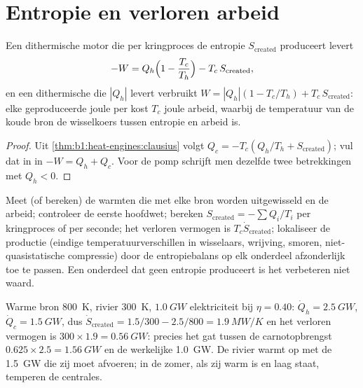 \section{Entropie en verloren arbeid}

\begin{theorem}\label{thm:b1:heat-engines:lostwork}
Een dithermische motor die per kringproces de entropie $S_{\mathrm{created}}$ produceert
levert
\[
-W = Q_h\Bigl(1 - \frac{T_c}{T_h}\Bigr) - T_c\,S_{\mathrm{created}} ,
\]
en een dithermische  die $|Q_h|$ levert verbruikt
$W = |Q_h|(1 - T_c/T_h) + T_c\,S_{\mathrm{created}}$: elke geproduceerde joule per 
kost $T_c$ joule arbeid, waarbij de temperatuur van de koude bron
de wisselkoers tussen entropie en arbeid is.
\end{theorem}

\begin{proof}
Uit \cref{thm:b1:heat-engines:clausius} volgt $Q_c = -T_c(Q_h/T_h + S_{\mathrm{created}})$;
vul dat in in $-W = Q_h + Q_c$. Voor de pomp schrijft men dezelfde twee betrekkingen
met $Q_h < 0$.
\end{proof}

\begin{method}\label{meth:b1:heat-engines:audit}
Meet (of bereken) de warmten die met elke bron worden uitgewisseld en de arbeid;
controleer de eerste hoofdwet; bereken $S_{\mathrm{created}} = -\sum Q_i/T_i$ per kringproces
of per seconde; het verloren vermogen is $T_c\dot S_{\mathrm{created}}$; lokaliseer de
productie (eindige temperatuurverschillen in wisselaars, wrijving, smoren,
niet-quasistatische compressie) door de entropiebalans op elk onderdeel
afzonderlijk toe te passen. Een onderdeel dat geen entropie produceert is het verbeteren niet waard.
\end{method}

\begin{example}\label{ex:b1:heat-engines:audit}
Warme bron \qty{800}{K}, rivier \qty{300}{K}, $\qty{1.0}{GW}$ elektriciteit
bij $\eta = 0.40$: $\dot Q_h = \qty{2.5}{GW}$, $\dot Q_c = \qty{1.5}{GW}$, dus
$\dot S_{\mathrm{created}} = 1.5/300 - 2.5/800 = \qty{1.9}{MW/K}$ en het verloren
vermogen is $300 \times 1.9 = \qty{0.56}{GW}$: precies het gat tussen de
carnotopbrengst $0.625 \times 2.5 = \qty{1.56}{GW}$ en de werkelijke \qty{1.0}{GW}.
De rivier warmt op met de \qty{1.5}{GW} die zij moet afvoeren; in de zomer, als
zij warm is en laag staat, temperen de centrales.
\end{example}

